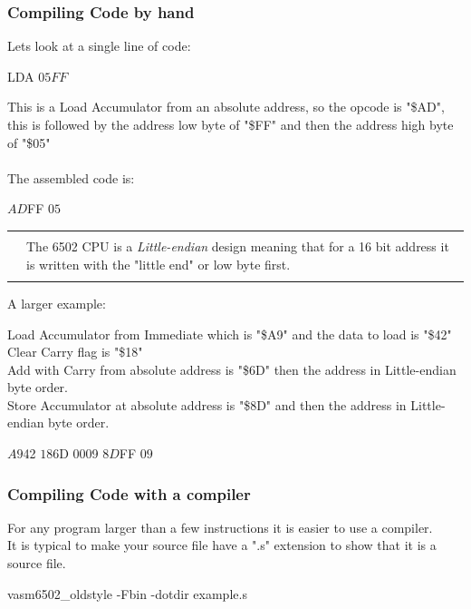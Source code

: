 \documentclass{ol-softwaremanual}
\newcommand{\Note}[1]{
\begin{table}[h]
\begin{tabular}{|p{0.1\textwidth}p{0.8\textwidth}|}
\hline
 & \\
\multicolumn{1}{|r}{\Huge\warning} & #1\\
 &  \\ \hline
\end{tabular}
\end{table}
}
\begin{document}
\subsubsection{Compiling Code by hand}
Lets look at a single line of code:
\begin{ffcode}
LDA $05FF
$\end{ffcode}
This is a Load Accumulator from an absolute address, so the opcode is "\$AD", this is followed by the address low byte of "\$FF" and then the address high byte of "\$05"\\
\\
The assembled code is:
\begin{ffcode}
$AD $FF $05
$\end{ffcode}

\Note{The 6502 CPU is a \emph{Little-endian} design meaning that for a 16 bit address it is written with the "little end" or low byte first.}

A larger example:

Load Accumulator from Immediate which is "\$A9" and the data to load is "\$42"\\
Clear Carry flag is "\$18"\\
Add with Carry from absolute address is "\$6D" then the address in Little-endian byte order.\\
Store Accumulator at absolute address is "\$8D" and then the address in Little-endian byte order.\\

\begin{ffcode}
$A9 $42
$18
$6D $00 $09
$8D $FF $09
$\end{ffcode}


\subsubsection{Compiling Code with a compiler}
For any program larger than a few instructions it is easier to use a compiler.\\

It is typical to make your source file have a ".s" extension to show that it is a source file.\\

\begin{ffcode}
vasm6502_oldstyle -Fbin -dotdir example.s
\end{ffcode}
\end{document}
